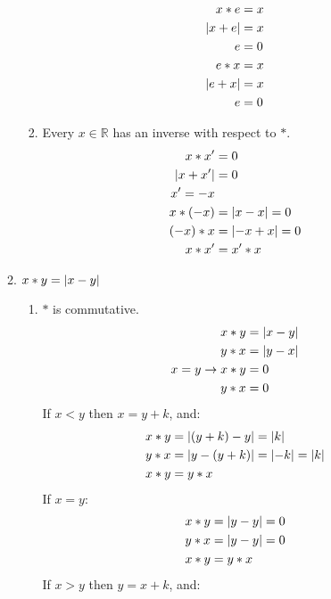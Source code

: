 \begin{enumerate}[label={\Alph*.},font={\bfseries}]
\begin{enumerate}[label={\arabic*},font={\bfseries}]
\begin{enumerate}[label={(\roman*)}]
\begin{align*}
              x*e &= x \\
              \lvert x+e\rvert &= x \\
              e &= 0 \\
              e*x &= x \\
              \lvert e+x\rvert &= x \\
              e &= 0
            \end{align*}
          \item Every $x\in\mathbb{R}$ has an inverse with respect to $*$.
            \begin{align*}
              x*x^\prime &= 0 \\
              \lvert x+x^\prime\rvert &= 0 \\
              x^\prime = -x \\
              x*(-x) &= \lvert x-x\rvert = 0 \\
              (-x)*x &= \lvert-x+x\rvert = 0 \\
              x*x^\prime &= x^\prime*x
            \end{align*}
        \end{enumerate}
      \item $x*y=\lvert x-y\rvert$
        \begin{enumerate}[label={(\roman*)}]
          \item $*$ is commutative.
            \begin{align*}
              x*y &= \lvert x-y\rvert \\
              y*x &= \lvert y-x\rvert \\
              x=y \to x*y &= 0 \\
              y*x &= 0 \\
            \end{align*}
            If $x<y$ then $x=y+k$, and:
            \begin{align*}
              x*y &= \lvert(y+k)-y\rvert = \lvert k\rvert \\
              y*x &= \lvert y-(y+k)\rvert = \lvert-k\rvert = \lvert k\rvert \\
              x*y &= y*x
            \end{align*}
            If $x=y$:
            \begin{align*}
              x*y &= \lvert y-y\rvert = 0 \\
              y*x &= \lvert y-y\rvert = 0 \\
              x*y &= y*x
            \end{align*}
            If $x>y$ then $y=x+k$, and:
            \begin{align*}

\end{align*}
\end{enumerate}
\end{enumerate}
\end{enumerate}

